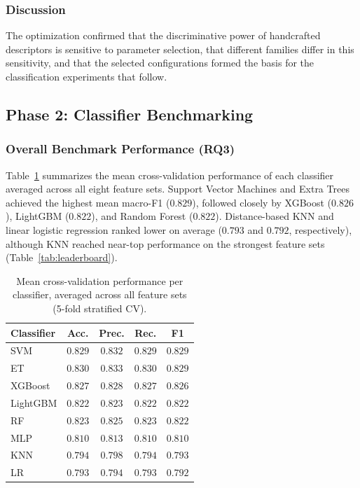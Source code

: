 \subsubsection{Discussion}
The optimization confirmed that the discriminative power of handcrafted
descriptors is sensitive to parameter selection, that different families differ
in this sensitivity, and that the selected configurations formed the basis for
the classification experiments that follow.

\subsection{Phase 2: Classifier Benchmarking}

\subsubsection{Overall Benchmark Performance (RQ3)}
Table~\ref{tab:overall} summarizes the mean cross-validation performance of
each classifier averaged across all eight feature sets. Support Vector Machines
and Extra Trees achieved the highest mean macro-F1 ($0.829$), followed closely
by XGBoost ($0.826$), LightGBM ($0.822$), and Random Forest ($0.822$).
Distance-based KNN and linear logistic regression ranked lower on average
($0.793$ and $0.792$, respectively), although KNN reached near-top performance
on the strongest feature sets (Table~\ref{tab:leaderboard}).

\begin{table}[t]
\centering
\caption{Mean cross-validation performance per classifier, averaged across all
feature sets (5-fold stratified CV).}
\label{tab:overall}
\renewcommand{\arraystretch}{1.2}
\begin{tabular}{@{}lcccc@{}}
\toprule
\textbf{Classifier} & \textbf{Acc.} & \textbf{Prec.} & \textbf{Rec.} & \textbf{F1} \\
\midrule
SVM      & $0.829$ & $0.832$ & $0.829$ & $0.829$ \\
ET       & $0.830$ & $0.833$ & $0.830$ & $0.829$ \\
XGBoost  & $0.827$ & $0.828$ & $0.827$ & $0.826$ \\
LightGBM & $0.822$ & $0.823$ & $0.822$ & $0.822$ \\
RF       & $0.823$ & $0.825$ & $0.823$ & $0.822$ \\
MLP      & $0.810$ & $0.813$ & $0.810$ & $0.810$ \\
KNN      & $0.794$ & $0.798$ & $0.794$ & $0.793$ \\
LR       & $0.793$ & $0.794$ & $0.793$ & $0.792$ \\
\bottomrule
\end{tabular}
\end{table}

